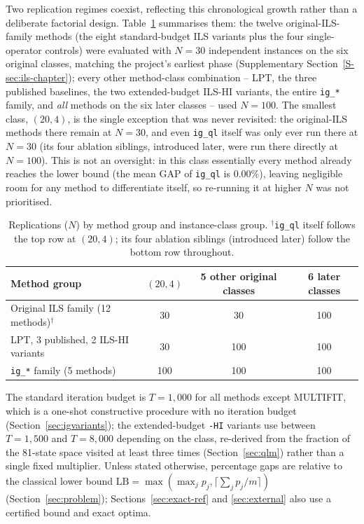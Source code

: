 \documentclass[final,3p,times,11pt,authoryear]{elsarticle}
\begin{document}
Two replication regimes coexist, reflecting this chronological growth
rather than a deliberate factorial design. Table~\ref{tab:replication}
summarises them: the twelve original-ILS-family methods (the eight
standard-budget ILS variants plus the four single-operator controls)
were evaluated with $N=30$ independent instances on the six original
classes, matching the project's earliest phase
(Supplementary Section~\ref{S-sec:ils-chapter}); every other method-class combination
-- LPT, the three published baselines, the two extended-budget ILS-HI
variants, the entire \texttt{ig\_*} family, and \emph{all} methods on
the six later classes -- used $N=100$. The smallest class, $(20,4)$,
is the single exception that was never revisited: the original-ILS
methods there remain at $N=30$, and even \texttt{ig\_ql} itself was
only ever run there at $N=30$ (its four ablation siblings, introduced
later, were run there directly at $N=100$). This is not an oversight:
in this class essentially every method already reaches the lower bound
(the mean GAP of \texttt{ig\_ql} is $0.00\%$), leaving negligible room
for any method to differentiate itself, so re-running it at higher $N$
was not prioritised.

\begin{table}[ht]
\centering
\caption{Replications ($N$) by method group and instance-class group.
         $^\dagger$\texttt{ig\_ql} itself follows the top row at
         $(20,4)$; its four ablation siblings (introduced later)
         follow the bottom row throughout.}
\label{tab:replication}
{\small
\begin{tabular}{@{}lccc@{}}
\toprule
Method group & $(20,4)$ & 5 other original classes & 6 later classes \\
\midrule
Original ILS family (12 methods)$^\dagger$ & 30 & 30 & 100 \\
LPT, 3 published, 2 ILS-HI variants & 30 & 100 & 100 \\
\texttt{ig\_*} family (5 methods) & 100 & 100 & 100 \\
\bottomrule
\end{tabular}}
\end{table}

The standard iteration budget is $T=1{,}000$ for all methods except
MULTIFIT, which is a one-shot constructive procedure with no iteration
budget (Section~\ref{sec:igvariants}); the extended-budget \texttt{-HI}
variants use between $T=1{,}500$ and $T=8{,}000$ depending on the class,
re-derived from the fraction of the 81-state space visited at least
three times (Section~\ref{sec:qlm}) rather than a single fixed
multiplier. Unless stated otherwise, percentage gaps are
relative to the classical lower bound
$\mathrm{LB} = \max(\max_j p_j, \lceil \sum_j p_j / m \rceil)$
(Section~\ref{sec:problem}); Sections~\ref{sec:exact-ref} and
\ref{sec:external} also use a certified bound and exact optima.
\end{document}
